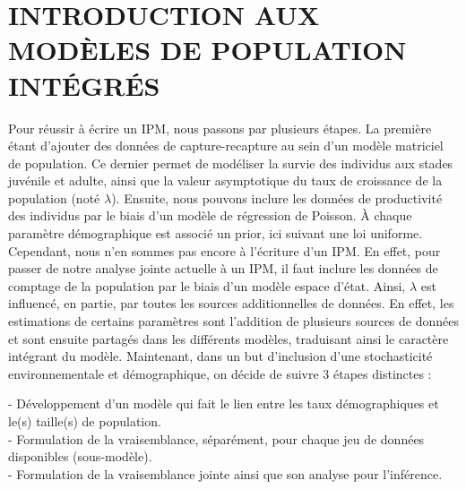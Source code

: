 \documentclass[12pt,a4paper]{article}
\begin{document}
\section{INTRODUCTION AUX MODÈLES DE POPULATION INTÉGRÉS}
Pour réussir à écrire un IPM, nous passons par plusieurs étapes. La première étant d'ajouter des données de capture-recapture au sein d'un modèle matriciel de population. Ce dernier permet de modéliser la survie des individus aux stades juvénile et adulte, ainsi que la valeur asymptotique du taux de croissance de la population (noté $\lambda$). Ensuite, nous pouvons inclure les données de productivité des individus par le biais d'un modèle de régression de Poisson. À chaque paramètre démographique est associé un prior, ici suivant une loi uniforme. Cependant, nous n'en sommes pas encore à l'écriture d'un IPM. En effet, pour passer de notre analyse jointe actuelle à un IPM, il faut inclure les données de comptage de la population par le biais d'un modèle espace d'état. Ainsi, $\lambda$ est influencé, en partie, par toutes les sources additionnelles de données. En effet, les estimations de certains paramètres sont l'addition de plusieurs sources de données et sont ensuite partagés dans les différents modèles, traduisant ainsi le caractère intégrant du modèle.
Maintenant, dans un but d'inclusion d'une stochasticité environnementale et démographique, on décide de suivre 3 étapes distinctes :

- Développement d'un modèle qui fait le lien entre les taux démographiques et le(s) taille(s) de population.\\

- Formulation de la vraisemblance, séparément, pour chaque jeu de données disponibles (sous-modèle). \\

- Formulation de la vraisemblance jointe ainsi que son analyse pour l'inférence.\\
\end{document}

